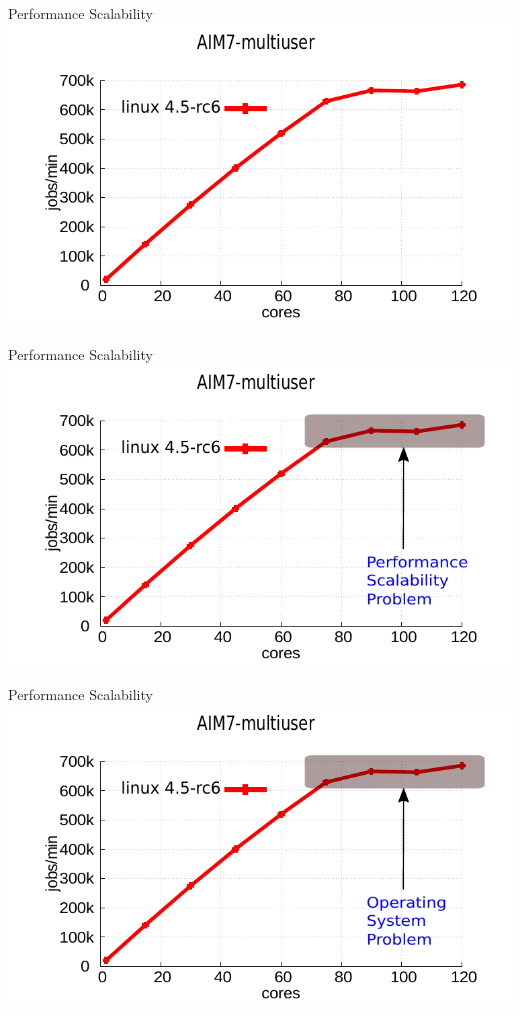 \documentclass[english]{beamer} %
\begin{document}
\begin{frame}{Performance Scalability}
\includegraphics[scale=0.8]{aim7_default}
\end{frame}

\begin{frame}{Performance Scalability}
\includegraphics[scale=0.8]{aim7_default_2}
\end{frame}

\begin{frame}{Performance Scalability}
\includegraphics[scale=0.8]{aim7_default_3}
\end{frame}
\end{document}
